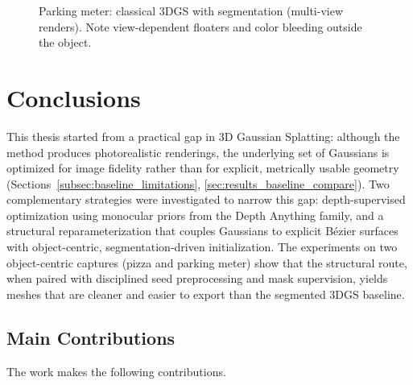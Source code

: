 \documentclass{report}
\begin{document}
\begin{figure}[H]
    \centering
    \caption{Parking meter: classical 3DGS with segmentation (multi-view renders). Note view-dependent floaters and color bleeding outside the object.}
    \label{fig:baseline_classic_segmented}
\end{figure}

\chapter{Conclusions}

This thesis started from a practical gap in 3D Gaussian Splatting: although the method produces photorealistic renderings, the underlying set of Gaussians is optimized for image fidelity rather than for explicit, metrically usable geometry (Sections~\ref{subsec:baseline_limitations}, \ref{sec:results_baseline_compare}). Two complementary strategies were investigated to narrow this gap: depth-supervised optimization using monocular priors from the Depth Anything family, and a structural reparameterization that couples Gaussians to explicit B\'ezier surfaces with object-centric, segmentation-driven initialization. The experiments on two object-centric captures (pizza and parking meter) show that the structural route, when paired with disciplined seed preprocessing and mask supervision, yields meshes that are cleaner and easier to export than the segmented 3DGS baseline.

\section{Main Contributions}

The work makes the following contributions.
\end{document}
